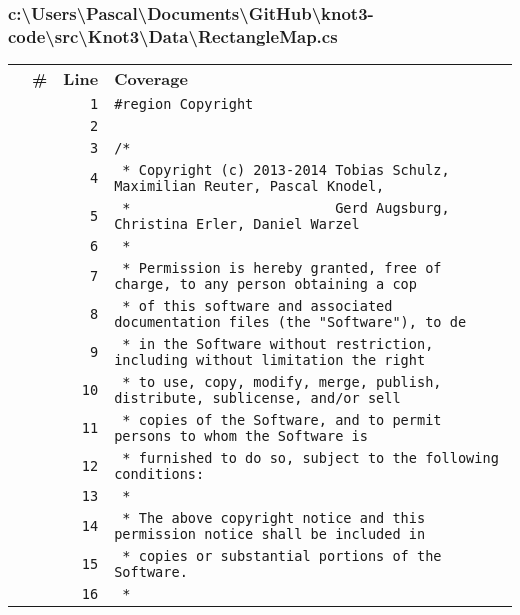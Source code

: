 \documentclass[a4paper,10pt]{article}
\begin{document}
\subsubsection{c:\textbackslash Users\textbackslash Pascal\textbackslash Documents\textbackslash GitHub\textbackslash knot3-code\textbackslash src\textbackslash Knot3\textbackslash Data\textbackslash RectangleMap.cs}
\begin{longtable}[l]{lrrl}
\textbf{} & \textbf{\#} & \textbf{Line} & \textbf{Coverage}\\
\cellcolor{gray} &  & \verb~1~ & \verb~#region Copyright~\\
\cellcolor{gray} &  & \verb~2~ & \verb~~\\
\cellcolor{gray} &  & \verb~3~ & \verb~/*~\\
\cellcolor{gray} &  & \verb~4~ & \verb~ * Copyright (c) 2013-2014 Tobias Schulz, Maximilian Reuter, Pascal Knodel,~\\
\cellcolor{gray} &  & \verb~5~ & \verb~ *                         Gerd Augsburg, Christina Erler, Daniel Warzel~\\
\cellcolor{gray} &  & \verb~6~ & \verb~ *~\\
\cellcolor{gray} &  & \verb~7~ & \verb~ * Permission is hereby granted, free of charge, to any person obtaining a cop~\\
\cellcolor{gray} &  & \verb~8~ & \verb~ * of this software and associated documentation files (the "Software"), to de~\\
\cellcolor{gray} &  & \verb~9~ & \verb~ * in the Software without restriction, including without limitation the right~\\
\cellcolor{gray} &  & \verb~10~ & \verb~ * to use, copy, modify, merge, publish, distribute, sublicense, and/or sell~\\
\cellcolor{gray} &  & \verb~11~ & \verb~ * copies of the Software, and to permit persons to whom the Software is~\\
\cellcolor{gray} &  & \verb~12~ & \verb~ * furnished to do so, subject to the following conditions:~\\
\cellcolor{gray} &  & \verb~13~ & \verb~ *~\\
\cellcolor{gray} &  & \verb~14~ & \verb~ * The above copyright notice and this permission notice shall be included in ~\\
\cellcolor{gray} &  & \verb~15~ & \verb~ * copies or substantial portions of the Software.~\\
\cellcolor{gray} &  & \verb~16~ & \verb~ *~\\

\end{longtable}
\end{document}
